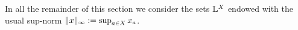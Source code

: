 %
%
%
In all the remainder of this section we consider the sets $\mathbb{L}^X$ endowed with the usual sup-norm $\lVert x\rVert_\infty:=\sup_{a\in X} x_a$.

